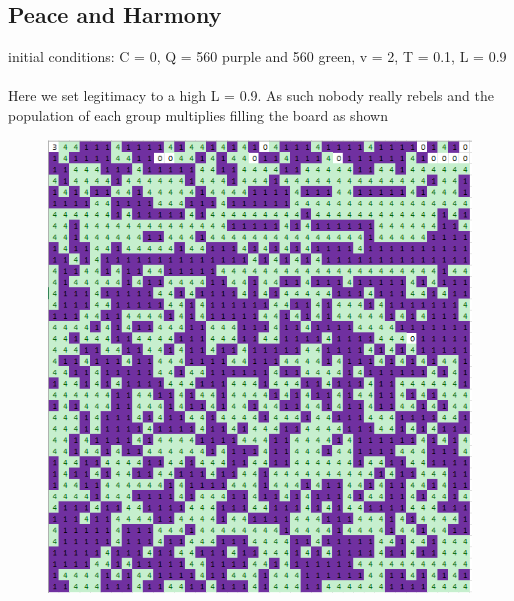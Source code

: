 \documentclass[11pt]{article}
\begin{document}
	\subsection{Peace and Harmony}
	initial conditions: C = 0, Q = 560 purple and 560 green, v = 2, T = 0.1, L = 0.9\\
	\\
	Here we set legitimacy to a high L = 0.9. As such nobody really rebels and the population of each group multiplies filling the board as shown 
	\begin{figure}[H]
		\includegraphics[width=\linewidth]{peacefull coexistance.png}
		\caption{}
		\label{fig:frenchriot}
	\end{figure}
	
\end{document}
